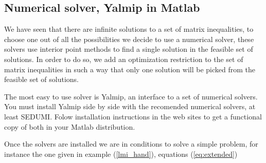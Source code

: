 \documentclass[nols]{tufte-handout}
\theoremstyle{definition}
\begin{document}
\subsection{Numerical solver, Yalmip in Matlab}
We have seen that there are infinite solutions to a set of matrix inequalities, to choose one out of all the possibilities we decide to use a numerical solver, these solvers use interior point methods to find a single solution in the feasible set of solutions. In order to do so, we add an optimization restriction to the set of matrix inequalities in such a way that only one solution will be picked from the feasible set of solutions.

The most easy to use solver is Yalmip, an interface to a set of numerical solvers. You must install Yalmip side by side with the recomended numerical solvers, at least SEDUMI. Folow installation instructions in the web sites to get a functional copy of both in your Matlab distribution.

Once the solvers are installed we are in conditions to solve a simple problem, for instance the one given in example (\ref{lmi_hand}), equations (\ref{eq:extended}) 
\end{document}
